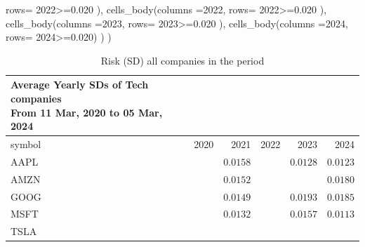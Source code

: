 \documentclass[
  letterpaper,
  DIV=11,
  numbers=noendperiod]{scrreprt}
\newenvironment{Shaded}{\begin{snugshade}}{\end{snugshade}}
\newcommand{\AttributeTok}[1]{\textcolor[rgb]{0.40,0.45,0.13}{#1}}
\newcommand{\FloatTok}[1]{\textcolor[rgb]{0.68,0.00,0.00}{#1}}
\newcommand{\FunctionTok}[1]{\textcolor[rgb]{0.28,0.35,0.67}{#1}}
\newcommand{\NormalTok}[1]{\textcolor[rgb]{0.00,0.23,0.31}{#1}}
\newcommand{\SpecialCharTok}[1]{\textcolor[rgb]{0.37,0.37,0.37}{#1}}
\newcommand{\StringTok}[1]{\textcolor[rgb]{0.13,0.47,0.30}{#1}}
\theoremstyle{definition}
\theoremstyle{remark}
\begin{document}
\begin{Shaded}
\begin{Highlighting}[]
                 \AttributeTok{rows=} \StringTok{\textasciigrave{}}\AttributeTok{2022}\StringTok{\textasciigrave{}}\SpecialCharTok{\textgreater{}=}\FloatTok{0.020}\NormalTok{  ), }
       \FunctionTok{cells\_body}\NormalTok{(}\AttributeTok{columns =}\StringTok{\textasciigrave{}}\AttributeTok{2022}\StringTok{\textasciigrave{}}\NormalTok{, }
                 \AttributeTok{rows=} \StringTok{\textasciigrave{}}\AttributeTok{2022}\StringTok{\textasciigrave{}}\SpecialCharTok{\textgreater{}=}\FloatTok{0.020}\NormalTok{  ), }
       \FunctionTok{cells\_body}\NormalTok{(}\AttributeTok{columns =}\StringTok{\textasciigrave{}}\AttributeTok{2023}\StringTok{\textasciigrave{}}\NormalTok{, }
                 \AttributeTok{rows=} \StringTok{\textasciigrave{}}\AttributeTok{2023}\StringTok{\textasciigrave{}}\SpecialCharTok{\textgreater{}=}\FloatTok{0.020}\NormalTok{  ), }
      \FunctionTok{cells\_body}\NormalTok{(}\AttributeTok{columns =}\StringTok{\textasciigrave{}}\AttributeTok{2024}\StringTok{\textasciigrave{}}\NormalTok{, }
                 \AttributeTok{rows=} \StringTok{\textasciigrave{}}\AttributeTok{2024}\StringTok{\textasciigrave{}}\SpecialCharTok{\textgreater{}=}\FloatTok{0.020}\NormalTok{)}
\NormalTok{    )}
\NormalTok{  )}
\end{Highlighting}
\end{Shaded}

\begin{longtable}{lrrrrr}

\caption{\label{tbl-risk-all-companies}Risk (SD) all companies in the
period}

\tabularnewline

\caption*{
{\large Average Yearly SDs of Tech companies} \\ 
{\small From 11 Mar, 2020 to 05 Mar, 2024}
} \\ 
\toprule
symbol & 2020 & 2021 & 2022 & 2023 & 2024 \\ 
\midrule\addlinespace[2.5pt]
AAPL & \cellcolor[HTML]{FF0000}{\textcolor[HTML]{FFFFFF}{$0.0283$}} & $0.0158$ & \cellcolor[HTML]{FF0000}{\textcolor[HTML]{FFFFFF}{$0.0224$}} & $0.0128$ & $0.0123$ \\ 
AMZN & \cellcolor[HTML]{FF0000}{\textcolor[HTML]{FFFFFF}{$0.0237$}} & $0.0152$ & \cellcolor[HTML]{FF0000}{\textcolor[HTML]{FFFFFF}{$0.0316$}} & \cellcolor[HTML]{FF0000}{\textcolor[HTML]{FFFFFF}{$0.0207$}} & $0.0180$ \\ 
GOOG & \cellcolor[HTML]{FF0000}{\textcolor[HTML]{FFFFFF}{$0.0234$}} & $0.0149$ & \cellcolor[HTML]{FF0000}{\textcolor[HTML]{FFFFFF}{$0.0244$}} & $0.0193$ & $0.0185$ \\ 
MSFT & \cellcolor[HTML]{FF0000}{\textcolor[HTML]{FFFFFF}{$0.0268$}} & $0.0132$ & \cellcolor[HTML]{FF0000}{\textcolor[HTML]{FFFFFF}{$0.0223$}} & $0.0157$ & $0.0113$ \\ 
TSLA & \cellcolor[HTML]{FF0000}{\textcolor[HTML]{FFFFFF}{$0.0538$}} & \cellcolor[HTML]{FF0000}{\textcolor[HTML]{FFFFFF}{$0.0342$}} & \cellcolor[HTML]{FF0000}{\textcolor[HTML]{FFFFFF}{$0.0423$}} & \cellcolor[HTML]{FF0000}{\textcolor[HTML]{FFFFFF}{$0.0340$}} & \cellcolor[HTML]{FF0000}{\textcolor[HTML]{FFFFFF}{$0.0309$}} \\ 
\bottomrule

\end{longtable}
\end{document}
